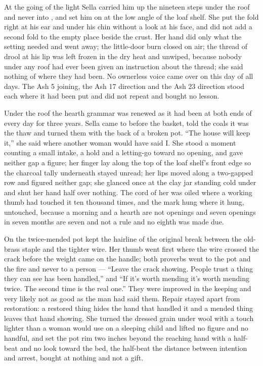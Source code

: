 At the going of the light Sella carried him up the nineteen steps under the roof and never into , and set him on  at the low angle of the loaf shelf. She put the fold right at his ear and under his chin without a look at his face, and did not add a second fold to the empty place beside the crust. Her hand did only what the setting needed and went away; the little-door burn closed on air; the thread of drool at his lip was left frozen in the dry heat and unwiped, because nobody under any roof had ever been given an instruction about the thread; she said nothing of where they had been. No ownerless voice came over  on this day of all days. The Ash 5 joining, the Ash 17 direction and the Ash 23 direction stood each where it had been put and did not repeat and bought no lesson.

\scenebreak

Under the roof the hearth grammar was renewed as it had been at both ends of every day for three years. Sella came to  before the basket, told the coals it was the thaw and turned them with the back of a broken pot. “The house will keep it,” she said where another woman would have said I. She stood a moment counting a small intake, a hold and a letting-go toward no opening, and gave neither gap a figure; her finger lay along the top of the loaf shelf's front edge so the charcoal tally underneath stayed unread; her lips moved along a two-gapped row and figured neither gap; she glanced once at the clay jar standing cold under  and shut her hand half over nothing. The cord of her  was oiled where a working thumb had touched it ten thousand times, and the mark hung where it hung, untouched, because a morning and a hearth are not openings and seven openings in seven months are seven and not a rule and no eighth was made due.

On  the twice-mended pot kept the hairline of the original break between the old-brass staple and the tighter wire. Her thumb went first where the wire crossed the crack before the weight came on the handle; both proverbs went to the pot and the fire and never to a person — “Leave the crack showing. People trust a thing they can see has been handled,” and “If it's worth mending it's worth mending twice. The second time is the real one.” They were improved in the keeping and very likely not as good as the man had said them. Repair stayed apart from restoration: a restored thing hides the hand that handled it and a mended thing leaves that hand showing. She turned the dressed grain under wool with a touch lighter than a woman would use on a sleeping child and lifted no figure and no handful, and set the pot rim two inches beyond the reaching hand with a half-beat and no look toward the bed, the half-beat the distance between intention and arrest, bought at nothing and not a gift.

